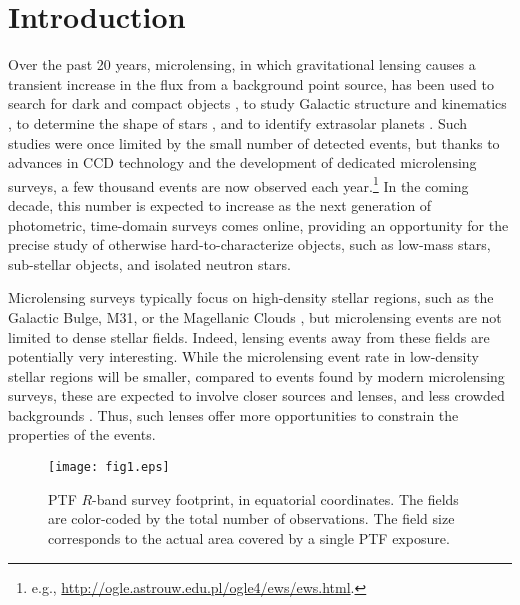 \documentclass{emulateapj}
\begin{document}

\section{Introduction}
Over the past 20 years, microlensing, in which gravitational lensing causes a transient increase in the flux from a background point source, has been used to search for dark and compact objects \citep{original_macho, oslowski2008, sartore2010}, to study Galactic structure and kinematics \citep{binney2000}, to determine the shape of stars \citep{rattenbury2005}, and to identify extrasolar planets \citep[][and references therein]{gaudi2011}. Such studies were once limited by the small number of detected events, but thanks to advances in CCD technology and the development of dedicated microlensing surveys, a few thousand events are now observed each year.\footnote{e.g., \url{http://ogle.astrouw.edu.pl/ogle4/ews/ews.html}.} In the coming decade, this number is expected to increase as the next generation of photometric, time-domain surveys comes online, providing an opportunity for the precise study of otherwise hard-to-characterize objects, such as low-mass stars, sub-stellar objects, and isolated neutron stars. 

Microlensing surveys typically focus on high-density stellar regions, such as the Galactic Bulge, M31, or the Magellanic Clouds \citep[e.g.,][]{original_ogle, original_macho, eros_original, crotts1996}, but microlensing events are not limited to dense stellar fields. Indeed, lensing events away from these fields are potentially very interesting. While the microlensing event rate in low-density stellar regions will be smaller, compared to events found by modern microlensing surveys, these are expected to involve closer sources and lenses, and less crowded backgrounds \citep{mesolensing1}. Thus, such lenses offer more opportunities to constrain the properties of the events.

\begin{figure*}[!t]
\centering\texttt{[image: fig1.eps]}
\caption{PTF $R$-band survey footprint, in equatorial coordinates. The fields are color-coded by the total number of observations. The field size corresponds to the actual area covered by a single PTF exposure.}\label{fig:survey_footprint}
\end{figure*}	
\end{document}

